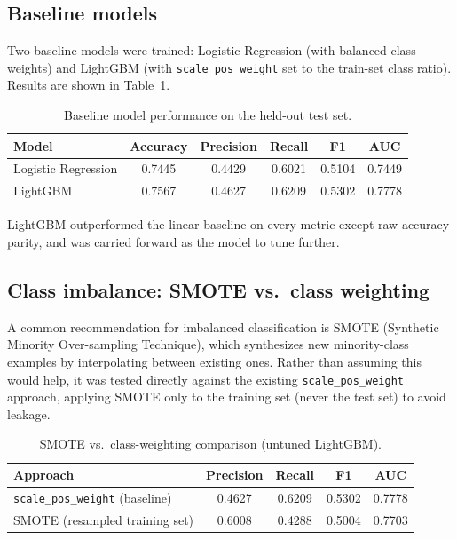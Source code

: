 \documentclass[11pt]{article}
\begin{document}
\subsection{Baseline models}
Two baseline models were trained: Logistic Regression (with balanced class
weights) and LightGBM (with \texttt{scale\_pos\_weight} set to the
train-set class ratio). Results are shown in Table~\ref{tab:baseline}.

\begin{table}[H]
\centering
\caption{Baseline model performance on the held-out test set.}
\label{tab:baseline}
\begin{tabular}{lccccc}
\toprule
\textbf{Model} & \textbf{Accuracy} & \textbf{Precision} & \textbf{Recall} & \textbf{F1} & \textbf{AUC} \\
\midrule
Logistic Regression & 0.7445 & 0.4429 & 0.6021 & 0.5104 & 0.7449 \\
LightGBM             & 0.7567 & 0.4627 & 0.6209 & 0.5302 & 0.7778 \\
\bottomrule
\end{tabular}
\end{table}

LightGBM outperformed the linear baseline on every metric except raw
accuracy parity, and was carried forward as the model to tune further.

\subsection{Class imbalance: SMOTE vs.\ class weighting}
\label{sec:imbalance}
A common recommendation for imbalanced classification is SMOTE (Synthetic
Minority Over-sampling Technique), which synthesizes new minority-class
examples by interpolating between existing ones. Rather than assuming this
would help, it was tested directly against the existing
\texttt{scale\_pos\_weight} approach, applying SMOTE only to the training
set (never the test set) to avoid leakage.

\begin{table}[H]
\centering
\caption{SMOTE vs.\ class-weighting comparison (untuned LightGBM).}
\label{tab:smote}
\begin{tabular}{lcccc}
\toprule
\textbf{Approach} & \textbf{Precision} & \textbf{Recall} & \textbf{F1} & \textbf{AUC} \\
\midrule
\texttt{scale\_pos\_weight} (baseline) & 0.4627 & 0.6209 & 0.5302 & 0.7778 \\
SMOTE (resampled training set)         & 0.6008 & 0.4288 & 0.5004 & 0.7703 \\
\bottomrule
\end{tabular}
\end{table}
\end{document}
